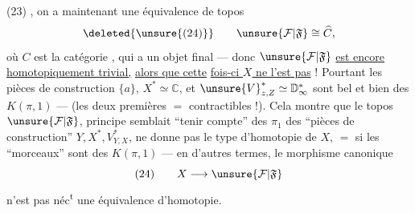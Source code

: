 \noindent (23)
,
on a maintenant une équivalence de topos
\[
\deleted{\unsure{(24)}}\qquad \unsure{\mathcal F|\mathfrak F}\cong\widehat C,
\]
où $C$ est la catégorie \diagram{\begin{tikzcd}[column sep=small]\bullet\arrow[r]&\bullet\end{tikzcd}}, qui a
un objet final --- donc $\unsure{\mathcal F|\mathfrak F}$ \uline{est encore}
\uline{homotopiquement trivial,} \uline{alors que cette}
\uline{fois-ci $X$ ne l'est pas} ! Pourtant les
pièces de construction $\{a\}$, $X^*\simeq\mathbb C$, et
$\unsure{V}^*_{z,Z}\simeq\mathbb D^*_{\infty}$ sont bel et bien des $K(\pi,1)$ ---
(les deux premières $=$ contractibles !). Cela
montre que le topos $\unsure{\mathcal F|\mathfrak F}$, 
principe semblait ``tenir compte'' des
$\pi_1$ des ``pièces de construction'' $Y,X^*,V^*_{Y,X}$,
ne donne pas  le type d'homotopie
de $X$, $=$ si les ``morceaux'' sont des
$K(\pi,1)$ --- en d'autres termes, le
morphisme canonique
\[
(24)\qquad X\longrightarrow\unsure{\mathcal F|\mathfrak F}
\]
n'est pas néc\textsuperscript{t} une équivalence d'homotopie.
